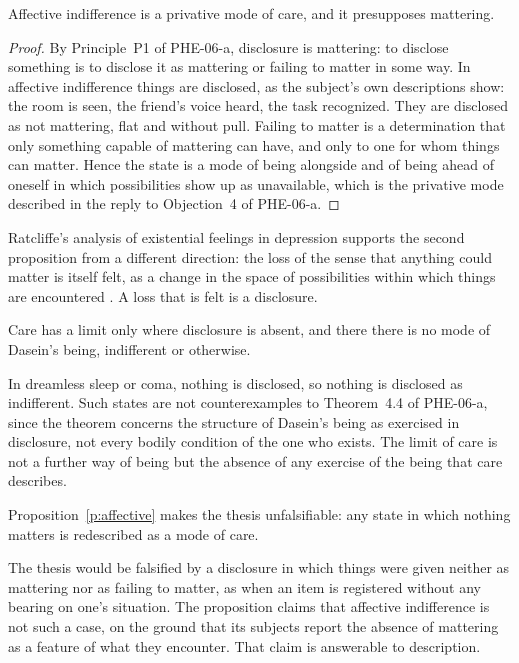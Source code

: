 \documentclass{situationist-preprint}
\begin{document}
\begin{proposition}\label{p:affective}
Affective indifference is a privative mode of care, and it presupposes mattering.
\end{proposition}

\begin{proof}
By Principle~P1 of PHE-06-a, disclosure is mattering: to disclose something is to disclose it as mattering or failing to matter in some way. In affective indifference things are disclosed, as the subject's own descriptions show: the room is seen, the friend's voice heard, the task recognized. They are disclosed as not mattering, flat and without pull. Failing to matter is a determination that only something capable of mattering can have, and only to one for whom things can matter. Hence the state is a mode of being alongside and of being ahead of oneself in which possibilities show up as unavailable, which is the privative mode described in the reply to Objection~4 of PHE-06-a.
\end{proof}

Ratcliffe's analysis of existential feelings in depression supports the second proposition from a different direction: the loss of the sense that anything could matter is itself felt, as a change in the space of possibilities within which things are encountered \citep{Ratcliffe2008}. A loss that is felt is a disclosure.

\begin{corollary}\label{c:limit}
Care has a limit only where disclosure is absent, and there there is no mode of Dasein's being, indifferent or otherwise.
\end{corollary}

In dreamless sleep or coma, nothing is disclosed, so nothing is disclosed as indifferent. Such states are not counterexamples to Theorem~4.4 of PHE-06-a, since the theorem concerns the structure of Dasein's being as exercised in disclosure, not every bodily condition of the one who exists. The limit of care is not a further way of being but the absence of any exercise of the being that care describes.

\begin{objection}
Proposition~\ref{p:affective} makes the thesis unfalsifiable: any state in which nothing matters is redescribed as a mode of care.
\end{objection}

\begin{reply}
The thesis would be falsified by a disclosure in which things were given neither as mattering nor as failing to matter, as when an item is registered without any bearing on one's situation. The proposition claims that affective indifference is not such a case, on the ground that its subjects report the absence of mattering as a feature of what they encounter. That claim is answerable to description.
\end{reply}
\end{document}
